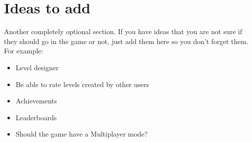 \documentclass[12pt, a4paper]{article}
\begin{document}
\section{Ideas to add}
Another completely optional section. If you have ideas that you are not sure if they should go in the game or not, just add them here so you don’t forget them.\\

For example:
\begin{tcolorbox}
    \begin{itemize}
        \item Level designer
        \item Be able to rate levels created by other users
        \item Achievements
        \item Leaderboards
        \item Should the game have a Multiplayer mode?
    \end{itemize}
\end{tcolorbox}
\end{document}
